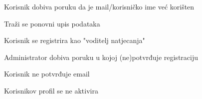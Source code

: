 \begin{packed_item}
\begin{packed_item}
\begin{packed_enum}
								\item Korisnik dobiva poruku da je mail/korisničko ime već korišten
								\item Traži se ponovni upis podataka
								
							\end{packed_enum}
							\item[2.f]Korisnik se registrira kao "voditelj natjecanja"
							\item[] \begin{packed_enum}
								
								\item Administrator dobiva poruku u kojoj (ne)potvrđuje registraciju
															
							\end{packed_enum}
							\item[4.a] Korisnik ne potvrđuje email
							\item[] \begin{packed_enum}
								
								\item Korisnikov profil se ne aktivira
								
							\end{packed_enum}						
							
						\end{packed_item}
					\end{packed_item}
					

